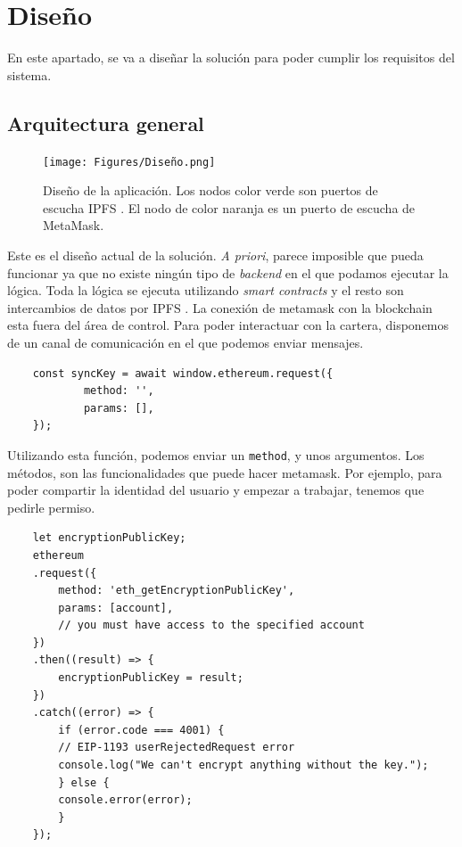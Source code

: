 \section{Diseño}
En este apartado, se va a diseñar la solución para poder cumplir los requisitos del sistema.
\subsection{Arquitectura general}
\begin{figure}[h!]
    \centering
    \texttt{[image: Figures/Diseño.png]}
    \caption{Diseño de la aplicación. Los nodos color verde son puertos de escucha IPFS \cite{web:ipfs}. El nodo de color naranja es un puerto de escucha de MetaMask.}
\end{figure}
Este es el diseño actual de la solución. \textit{A priori}, parece imposible que pueda funcionar ya que no existe ningún tipo de \textit{backend} en el que podamos ejecutar la lógica. Toda la lógica se ejecuta utilizando \textit{smart contracts} y el resto son intercambios de datos por IPFS \cite{web:ipfs}.
La conexión de metamask con la blockchain esta fuera del área de control. Para poder interactuar con la cartera, disponemos de un canal de comunicación en el que podemos enviar mensajes.
\begin{lstlisting}
    const syncKey = await window.ethereum.request({
			method: '',
			params: [],
    });
\end{lstlisting}
Utilizando esta función, podemos enviar un \verb|method|, y unos argumentos. Los métodos, son las funcionalidades que puede hacer metamask.
Por ejemplo, para poder compartir la identidad del usuario y empezar a trabajar, tenemos que pedirle permiso. 
\begin{lstlisting}
    let encryptionPublicKey;
    ethereum
    .request({
        method: 'eth_getEncryptionPublicKey',
        params: [account], 
        // you must have access to the specified account
    })
    .then((result) => {
        encryptionPublicKey = result;
    })
    .catch((error) => {
        if (error.code === 4001) {
        // EIP-1193 userRejectedRequest error
        console.log("We can't encrypt anything without the key.");
        } else {
        console.error(error);
        }
    });
\end{lstlisting}
\cite{web:metamask_wiki}
